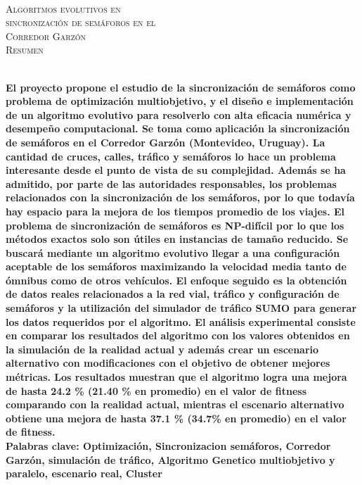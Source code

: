 {
\thispagestyle{empty}
~\\[0.2cm]
\begin{center}
    \textsc{\huge Algoritmos evolutivos en  } \\[0.2cm] 
    \textsc{\huge sincronización de semáforos en el  } \\[0.2cm]         
    \textsc{\huge Corredor Garzón} \\[1cm]
    \textsc{\Large Resumen}
\end{center}
~\\[0.2cm]
\textbf{\large 
El proyecto propone el estudio de la sincronización de semáforos como problema de optimización multiobjetivo, y el diseño e implementación de un algoritmo evolutivo para resolverlo con alta eficacia numérica y desempeño computacional. \newline \newline
Se toma como aplicación la sincronización de semáforos en el Corredor Garzón  (Montevideo, Uruguay). La cantidad de cruces, calles, tráfico y semáforos lo hace un problema interesante desde el punto de vista de su complejidad. Además se ha admitido, por parte de las autoridades responsables, los problemas relacionados con la sincronización de los semáforos, por lo que todavía hay espacio para la mejora de los tiempos promedio de los viajes.  \newline \newline
El problema de sincronización de semáforos es NP-difícil por lo que los métodos exactos solo son útiles en instancias de tamaño reducido. Se buscará mediante un algoritmo evolutivo llegar a una configuración aceptable de los semáforos maximizando la velocidad media tanto de ómnibus como de otros vehículos.
El enfoque seguido es la obtención de datos reales relacionados a la red vial, tráfico y configuración de semáforos y la utilización del simulador de tráfico SUMO para generar los datos requeridos por el algoritmo.
\newline \newline
El análisis experimental consiste en comparar los resultados del algoritmo con los valores obtenidos en la simulación de la realidad actual y además crear un escenario alternativo con modificaciones con el objetivo de obtener mejores métricas. Los resultados muestran que el algoritmo logra una mejora de hasta  24.2 \% (21.40 \% en promedio) en el valor de fitness comparando con la realidad actual, mientras el escenario alternativo obtiene una mejora de hasta 37.1 \% (34.7\% en promedio) en el valor de fitness.
 } 	
	~\\[1.0cm]
    \textbf{\large Palabras clave: Optimización, Sincronizacion semáforos, Corredor Garzón, simulación de tráfico,  Algoritmo Genetico multiobjetivo y paralelo,  escenario real, Cluster}

}
\cleardoublepage
